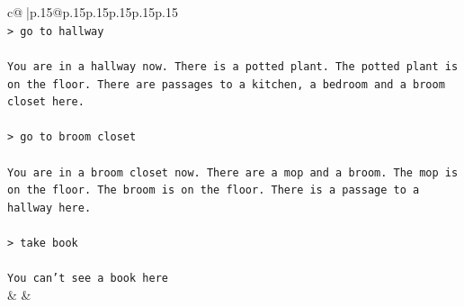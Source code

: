 \documentclass{article}
\begin{document}
{\begin{supertabular}{c@{$\;$}|p{.15\linewidth}@{}p{.15\linewidth}p{.15\linewidth}p{.15\linewidth}p{.15\linewidth}p{.15\linewidth}}
{{{\\ 
\texttt{> go to hallway} \\
\\ 
\texttt{You are in a hallway now. There is a potted plant. The potted plant is on the floor. There are passages to a kitchen, a bedroom and a broom closet here.} \\
\\ 
\texttt{> go to broom closet} \\
\\ 
\texttt{You are in a broom closet now. There are a mop and a broom. The mop is on the floor. The broom is on the floor. There is a passage to a hallway here.} \\
\\ 
\texttt{> take book} \\
\\ 
\texttt{You can't see a book here} \\
            }
        }
    }
    & & \\ \\


\end{supertabular}}
\end{document}
